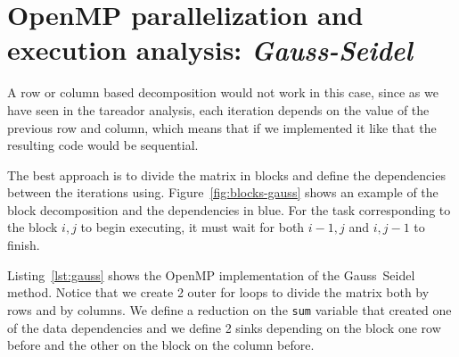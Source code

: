 
\pagebreak
\section{OpenMP parallelization and execution analysis: \emph{Gauss-Seidel}}




A row or column based decomposition would not work in this case, since as we have seen in the
tareador analysis, each iteration depends on the value of the previous row and column,
which means that if we implemented it like that the resulting code would be sequential.

The best approach is to divide the matrix in blocks and define the dependencies between the
iterations using. Figure~\ref{fig:blocks-gauss} shows an example
of the block decomposition and the dependencies in blue. For the task corresponding to
the block $i,j$ to begin executing, it must wait for both $i-1, j$ and $i, j-1$ to finish.

Listing~\ref{lst:gauss} shows the OpenMP implementation of the Gauss~Seidel method. Notice that we create 2
outer for loops to divide the matrix both by rows and by columns. We define a reduction on the \texttt{sum}
variable that created one of the data dependencies and we define 2 sinks depending on
the block one row before and the other on the block on the column before.



